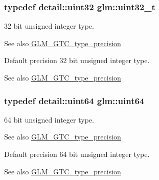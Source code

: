 \subsubsection[{\texorpdfstring{uint32\+\_\+t}{uint32_t}}]{\setlength{\rightskip}{0pt plus 5cm}typedef detail\+::uint32 {\bf glm\+::uint32\+\_\+t}}\hypertarget{group__gtc__type__precision_ga822ca53a9ad412504532838906276a99}{}\label{group__gtc__type__precision_ga822ca53a9ad412504532838906276a99}
32 bit unsigned integer type. \begin{DoxySeeAlso}{See also}
\hyperlink{group__gtc__type__precision}{G\+L\+M\+\_\+\+G\+T\+C\+\_\+type\+\_\+precision}
\end{DoxySeeAlso}
Default precision 32 bit unsigned integer type. \begin{DoxySeeAlso}{See also}
\hyperlink{group__gtc__type__precision}{G\+L\+M\+\_\+\+G\+T\+C\+\_\+type\+\_\+precision} 
\end{DoxySeeAlso}
\subsubsection[{\texorpdfstring{uint64}{uint64}}]{\setlength{\rightskip}{0pt plus 5cm}typedef detail\+::uint64 {\bf glm\+::uint64}}\hypertarget{group__gtc__type__precision_gae3632bf9b37da66233d78930dd06378a}{}\label{group__gtc__type__precision_gae3632bf9b37da66233d78930dd06378a}
64 bit unsigned integer type. \begin{DoxySeeAlso}{See also}
\hyperlink{group__gtc__type__precision}{G\+L\+M\+\_\+\+G\+T\+C\+\_\+type\+\_\+precision}
\end{DoxySeeAlso}
Default precision 64 bit unsigned integer type. \begin{DoxySeeAlso}{See also}
\hyperlink{group__gtc__type__precision}{G\+L\+M\+\_\+\+G\+T\+C\+\_\+type\+\_\+precision} 
\end{DoxySeeAlso}
